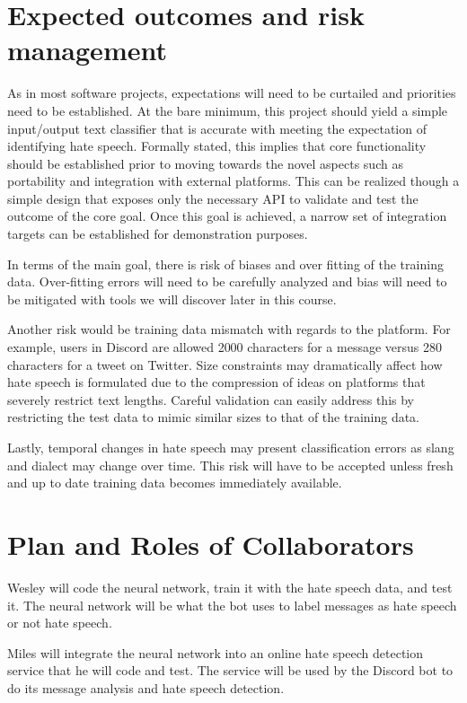 \documentclass[conference]{sig-alternate-05-2015}
\begin{document}
\section{Expected outcomes and risk management}

As in most software projects, expectations will need to be curtailed and priorities need to be established.  At the bare minimum, this project should yield a simple input/output text classifier that is accurate with meeting the expectation of identifying hate speech.  Formally stated, this implies that core functionality should be established prior to moving towards the novel aspects such as portability and integration with external platforms.  This can be realized though a simple design that exposes only the necessary API to validate and test the outcome of the core goal.  Once this goal is achieved, a narrow set of integration targets can be established for demonstration purposes.

In terms of the main goal, there is risk of biases and over fitting of the training data.  Over-fitting errors will need to be carefully analyzed and bias will need to be mitigated with tools we will discover later in this course.

Another risk would be training data mismatch with regards to the platform.  For example, users in Discord are allowed 2000 characters for a message versus 280 characters for a tweet on Twitter.  Size constraints may dramatically affect how hate speech is formulated due to the compression of ideas on platforms that severely restrict text lengths.  Careful validation can easily address this by restricting the test data to mimic similar sizes to that of the training data.

Lastly, temporal changes in hate speech may present classification errors as slang and dialect may change over time.  This risk will have to be accepted unless fresh and up to date training data becomes immediately available.

\section{Plan and Roles of Collaborators}

Wesley will code the neural network, train it with the hate speech data, and test it. The neural network will be what the bot uses to label messages as hate speech or not hate speech.

Miles will integrate the neural network into an online hate speech detection service that he will code and test. The service will be used by the Discord bot to do its message analysis and hate speech detection. 
\end{document}
